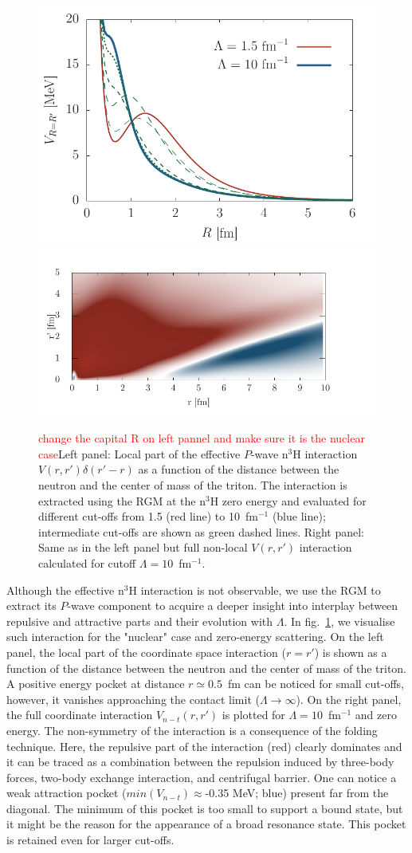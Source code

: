 \documentclass[5p,times]{elsarticle}
\newcommand{\edit}[1] {\textcolor{red}{{#1}}}
\begin{document}
%
\begin{figure}
\centering
\includegraphics[width=.39\textwidth]{./Graphs/rgm_potential_unit}
\hfill
\includegraphics[width=.60\textwidth]{./Graphs/NonLocPot10_nuc}
\caption{\edit{change the capital R on left pannel and make sure it is the nuclear case}Left panel: Local part of the effective $P$-wave n$^3$H interaction $V(r,r')\delta(r'-r)$ as a function of the distance between the neutron and the center of mass of the triton. The interaction is extracted using the RGM at the n$^3$H zero energy and evaluated for different cut-offs from 1.5 (red line) to 10~fm$^{-1}$ (blue line); intermediate cut-offs are shown as green dashed lines. Right panel: Same as in the left panel but full non-local $V(r,r')$ interaction calculated for cutoff $\Lambda=10$~fm$^{-1}$.}\label{Fig:Potential}
\end{figure}


%

%
\vspace{2mm}
%
Although the effective n$^3$H interaction is not observable, we use the RGM to extract its $P$-wave
component to acquire a deeper insight into interplay between repulsive and attractive parts and their evolution with $\Lambda$. In fig.~\ref{Fig:Potential}, we visualise such interaction for the "nuclear" case and zero-energy scattering. On the left panel, the local part of the coordinate space interaction ($r=r'$) is shown as a function of the distance between the neutron and the center of mass of the triton. 
A positive energy pocket at distance $r\simeq0.5$~fm can be noticed for small cut-offs, however, it vanishes approaching the contact limit ($\Lambda\to\infty$). On the right panel, the full coordinate interaction $V_{n-t}(r,r')$ is plotted for $\Lambda=10$~fm$^{-1}$ and zero energy. 
The non-symmetry of the interaction is a consequence of the folding technique. 
Here, the repulsive part of the interaction (red) clearly dominates and it can be traced as a combination between the repulsion induced by three-body forces, two-body exchange interaction, and centrifugal barrier. 
One can notice a weak attraction pocket ($min(V_{n-t})\approx$-0.35 MeV; blue) present far from the diagonal. 
The minimum of this pocket is too small to support a bound state, but it might be the reason for the appearance of a broad resonance state. This pocket is retained even for larger cut-offs. 
\end{document}
